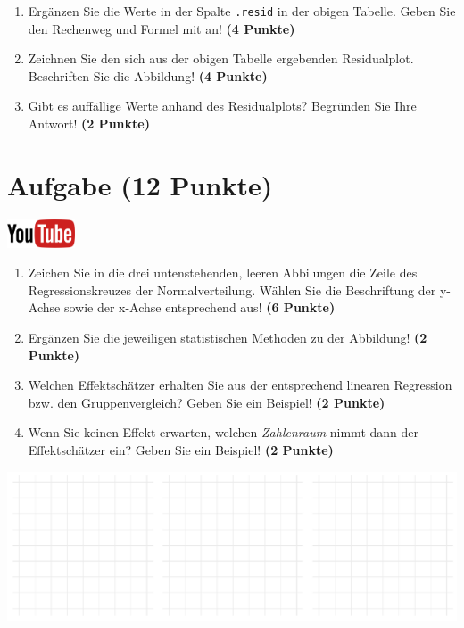 \documentclass[a4paper, 9pt]{scrartcl}\usepackage[]{graphicx}\usepackage[]{xcolor}
\makeatletter
\def\maxwidth{ %
  \ifdim\Gin@nat@width>\linewidth
    \linewidth
  \else
    \Gin@nat@width
  \fi
}
\makeatother
\begin{document}
\begin{enumerate}
\item Erg{\"a}nzen Sie die Werte in der Spalte \texttt{.resid} in der obigen
  Tabelle. Geben Sie den Rechenweg und Formel mit an! \textbf{(4 Punkte)}
\item Zeichnen Sie den sich aus der obigen Tabelle ergebenden
  Residualplot. Beschriften Sie die Abbildung! \textbf{(4 Punkte)}
\item Gibt es auff{\"a}llige Werte anhand des Residualplots? Begr{\"u}nden Sie Ihre
  Antwort! \textbf{(2 Punkte)}
\end{enumerate}
 
\clearpage

\section{Aufgabe \hfill (12 Punkte)}

\hfill\href{https://youtu.be/lHzRgm7hPw0}{\includegraphics[width =
  2cm]{img/youtube}}\\[1Ex]



\begin{enumerate}
\item Zeichen Sie in die drei untenstehenden, leeren Abbilungen die Zeile des
  Regressionskreuzes der Normalverteilung. W{\"a}hlen Sie die Beschriftung der
  y-Achse sowie der x-Achse entsprechend aus! \textbf{(6 Punkte)}
\item Erg{\"a}nzen Sie die jeweiligen statistischen Methoden zu der Abbildung! \textbf{(2 Punkte)}
\item Welchen Effektsch{\"a}tzer erhalten Sie aus der entsprechend linearen
  Regression bzw. den Gruppenvergleich? Geben Sie ein Beispiel! \textbf{(2 Punkte)}
\item Wenn Sie keinen Effekt erwarten, welchen \textit{Zahlenraum} nimmt dann
  der Effektsch{\"a}tzer ein? Geben Sie ein Beispiel! \textbf{(2 Punkte)}
\end{enumerate}



{\centering \includegraphics[width=\maxwidth]{img/regression-01-1} 

}
\end{document}
